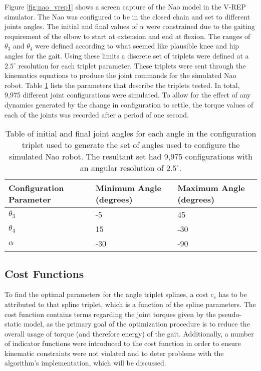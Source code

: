 Figure \ref{fig:nao_vrep1} shows a screen capture of the Nao model in the V-REP simulator. 
The Nao was configured to be in the closed chain and set to different joints angles. 
The initial and final values of $\alpha$ were constrained due to the gaiting requirement of the elbow to start at 
extension and end at flexion. The ranges of $\theta_3$ and $\theta_4$ were defined according to what seemed
like plausible knee and hip angles for the gait. Using these limits a discrete set of triplets were defined
at a $2.5^\circ$ resolution for each triplet parameter. These triplets were sent through the kinematics equations to produce the joint
commands for the simulated Nao robot. 
Table \ref{tab:angle_set_params1} lists the parameters that describe the triplets tested. In total, 9,975
different joint configurations were simulated.
To allow for the effect of
any dynamics generated by the change in configuration to settle, the torque values of each of the joints was recorded
after a period of one second.

\begin{table}
	\centering
	\begin{tabularx}{0.65 \textwidth}{|X||X|X|}
		\hline
		\textbf{Configuration Parameter} 	&	\textbf{Minimum Angle (degrees)} 		&	\textbf{Maximum Angle (degrees)} 	\\	\hline\hline
		$\theta_3$ 	  & 	-5   &	 45 	\\	\hline
		$\theta_4$		&	  15	 &	-30	  \\ 	\hline
		$\alpha$			&  -30	 &	-90		\\ 	\hline
	\end{tabularx} 
	
	\caption{Table of initial and final joint angles for each angle in the configuration triplet used to generate the set of
				angles used to configure the simulated Nao robot.
				The resultant set had 9,975 configurations with an angular resolution of $2.5^\circ$.}
	\label{tab:angle_set_params1}
\end{table}

\subsection{Cost Functions}

To find the optimal parameters for the angle triplet splines, a cost $c_s$ has to be attributed
to that spline triplet, which is a function of the spline parameters.
The cost function contains terms regarding the joint torques given by the pseudo-static model, as
the primary goal of the optimization procedure is to reduce the overall usage of torque
(and therefore energy) of the gait. Additionally, a number of indicator functions
were introduced to the cost function in order to ensure kinematic constraints were not violated
and to deter problems with the algorithm's implementation, which will be discussed.

